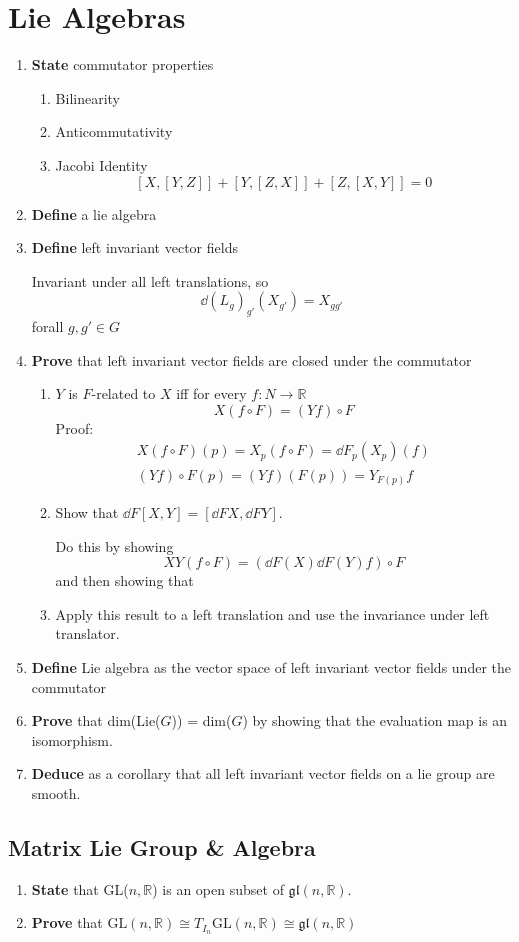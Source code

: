 \documentclass[prb,12pt]{revtex4-2}
\theoremstyle{definition}
\theoremstyle{definition}
\newcommand{\R}{\mathbb{R}}
\begin{document}
\section{Lie Algebras}
\begin{enumerate}[resume]
	\item \textbf{State} commutator properties
	\begin{enumerate}[label=(\alph*)]
		\item Bilinearity
		\item Anticommutativity
		\item Jacobi Identity
		\[[X,[Y,Z]]+[Y,[Z,X]]+[Z,[X,Y]]=0\]
	\end{enumerate}
		\item \textbf{Define} a lie algebra
	\item \textbf{Define} left invariant vector fields
	
	Invariant under all left translations, so
	\[\dd{(L_g)_{g'}}(X_{g'})=X_{gg'}\]
	forall $g,g'\in G$
	\item \textbf{Prove} that left invariant vector fields are closed under the commutator
	\begin{enumerate}[label=(\alph*)]
	\item $Y$ is $F$-related to $X$ iff for every $f:N\to \R$
	\[X(f\circ F)=(Yf)\circ F\]
	Proof:
	\begin{gather*}
		X(f\circ F)(p)=X_p(f\circ F)=\dd{F}_p(X_p)(f)\\
		(Yf)\circ F(p)=(Yf)(F(p))=Y_{F(p)}f
	\end{gather*}
	\item Show that $\dd{F}[X,Y] = [\dd{F}X,\dd{F}Y]$.
	
	Do this by showing
	\[XY(f\circ F) = (\dd{F}(X)\dd{F}(Y)f)\circ F\]
	and then showing that
	\item Apply this result to a left translation and use the invariance under left translator.
\end{enumerate}
\item \textbf{Define} Lie algebra as the vector space of left invariant vector fields under the commutator
	\item \textbf{Prove} that dim(Lie($G$)) = dim($G$) by showing that the evaluation map is an isomorphism.
	\item \textbf{Deduce} as a corollary that all left invariant vector fields on a lie group are smooth.
\end{enumerate}
\subsection{Matrix Lie Group \& Algebra}
\begin{enumerate}[resume]
	\item \textbf{State} that GL($n, \R$) is an open subset of $\mathfrak{gl}(n, \R)$.
	\item \textbf{Prove} that $\text{GL}(n, \R)\cong T_{I_n}\text{GL}(n, \R)\cong \mathfrak{gl}(n, \R)$
\end{enumerate}
\end{document}
